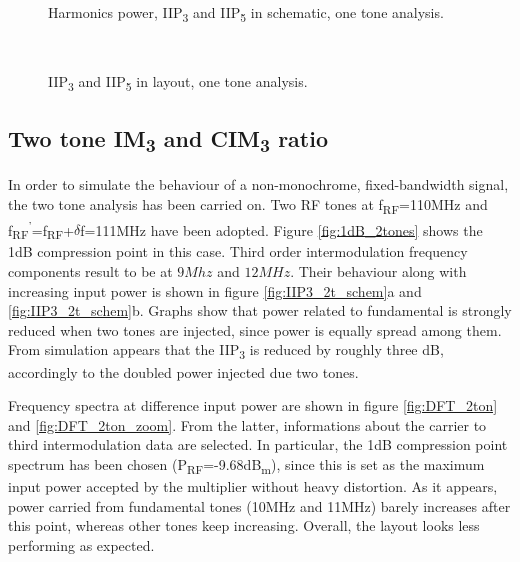 \begin{figure}[H] 
	\centering
	 \\
	\caption{Harmonics power, IIP\textsubscript{3} and IIP\textsubscript{5} in schematic, one tone analysis.}
	\label{fig:IIP3_1t_schem}
\end{figure}

\begin{figure}[H] 
	\centering
	 \\
	\caption{IIP\textsubscript{3} and IIP\textsubscript{5} in layout, one tone analysis.}
	\label{fig:IIP3_1t_layout}
\end{figure}

\subsection{Two tone IM\textsubscript{3} and CIM\textsubscript{3} ratio}
In order to simulate the behaviour of a non-monochrome, fixed-bandwidth signal, the two tone analysis has been carried on. Two RF tones at f\textsubscript{RF}=110MHz and f\textsubscript{RF}\textsuperscript{'}=f\textsubscript{RF}+\(\delta\)f=111MHz have been adopted.
Figure \ref{fig:1dB_2tones} shows the 1dB compression point in this case.
Third order intermodulation frequency components result to be at \(9Mhz\) and \(12MHz\). Their behaviour along with increasing input power is shown in figure \ref{fig:IIP3_2t_schem}a and \ref{fig:IIP3_2t_schem}b. 
Graphs show that power related to fundamental is strongly reduced when two tones are injected, since power is equally spread among them. From simulation appears that the IIP\textsubscript{3} is reduced by roughly three dB, accordingly to the doubled power injected due two tones. 

Frequency spectra at difference input power are shown in figure \ref{fig:DFT_2ton} and \ref{fig:DFT_2ton_zoom}. From the latter, informations about the carrier to third intermodulation data are selected. In particular, the 1dB compression point spectrum has been chosen (P\textsubscript{RF}=-9.68dB\textsubscript{m}), since this is set as the maximum input power accepted by the multiplier without heavy distortion. As it appears, power carried from fundamental tones (10MHz and 11MHz) barely increases after this point, whereas other tones keep increasing. Overall, the layout looks less performing as expected.  

